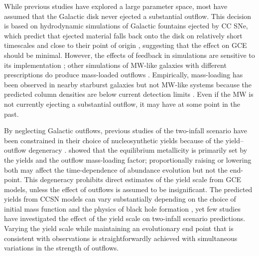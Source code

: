 \documentclass[twocolumn,twocolappendix,linenumbers]{aastex631}
\begin{document}
While previous studies have explored a large parameter space, most have assumed that the Galactic disk never ejected a substantial outflow. This decision is based on hydrodynamic simulations of Galactic fountains ejected by CC SNe, which predict that ejected material falls back onto the disk on relatively short timescales \citep{spitoni_galactic_2008,spitoni_effects_2009} and close to their point of origin \citep{melioli_hydrodynamical_2008,melioli_hydrodynamical_2009}, suggesting that the effect on GCE should be minimal. However, the effects of feedback in simulations are sensitive to its implementation \citep[e.g.,][]{li_effects_2020,hu_code_2023}; other simulations of MW-like galaxies with different prescriptions do produce mass-loaded outflows \citep[e.g.,][]{brook_hierarchical_2011,gutcke_nihao_2017,nelson_first_2019,peschken_angular_2021,kopenhafer_seeking_2023}. Empirically, mass-loading has been observed in nearby starburst galaxies \citep[e.g.,][]{lopez_temperature_2020,cameron_duvet_2021,lopez_x-ray_2023} but not MW-like systems because the predicted column densities are below current detection limits \citep[see reviews by][]{veilleux_cool_2020,thompson_theory_2024}. Even if the MW is not currently ejecting a substantial outflow, it may have at some point in the past.

By neglecting Galactic outflows, previous studies of the two-infall scenario have been constrained in their choice of nucleosynthetic yields \citep{francois_evolution_2004} because of the yield--outflow degeneracy \citep[e.g.,][]{hartwick_chemical_1976,cooke_primordial_2022,johnson_dwarf_2023,sandford_strong_2024}. \citet{weinberg_equilibrium_2017} showed that the equilibrium metallicity is primarily set by the yields and the outflow mass-loading factor; proportionally raising or lowering both may affect the time-dependence of abundance evolution but not the end-point. This degeneracy prohibits direct estimates of the yield scale from GCE models, unless the effect of outflows is assumed to be insignificant. The predicted yields from CCSN models can vary substantially depending on the choice of initial mass function \citep{vincenzo_modern_2016} and the physics of black hole formation \citep{griffith_impact_2021}, yet few studies have investigated the effect of the yield scale on two-infall scenario predictions. Varying the yield scale while maintaining an evolutionary end point that is consistent with observations is straightforwardly achieved with simultaneous variations in the strength of outflows.
\end{document}
